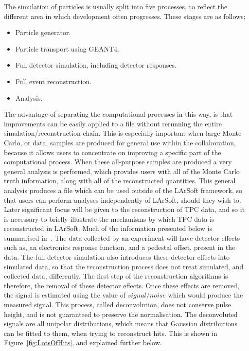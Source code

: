 The simulation of particles is usually split into five processes, to reflect the different area in which development often progresses. These stages are as follows;
\begin{itemize}
\item Particle generator.
\item Particle transport using GEANT4.
\item Full detector simulation, including detector responses. 
\item Full event reconstruction.
\item Analysis.
\end{itemize}
The advantage of separating the computational processes in this way, is that improvements can be easily applied to a file without rerunning the entire simulation/reconstruction chain. This is especially important when large Monte Carlo, or data, samples are produced for general use within the collaboration, because it allows users to concentrate on improving a specific part of the computational process. When these all-purpose samples are produced a very general analysis is performed, which provides users with all of the Monte Carlo truth information, along with all of the reconstructed quantities. This general analysis produces a file which can be used outside of the LArSoft framework, so that users can perform analyses independently of LArSoft, should they wish to. \\

Later significant focus will be given to the reconstruction of TPC data, and so it is necessary to briefly illustrate the mechanisms by which TPC data is reconstructed in LArSoft. Much of the information presented below is summarised in~\citep{LArSoftOrg, LArSoftRecoNote}. The data collected by an experiment will have detector effects such as, an electronics response function, and a pedestal offset, present in the data. The full detector simulation also introduces these detector effects into simulated data, so that the reconstruction process does not treat simulated, and collected data, differently. The first step of the reconstruction algorithms is therefore, the removal of these detector effects. Once these effects are removed, the signal is estimated using the value of $signal/noise$ which would produce the measured signal. This process, called deconvolution, does not conserve pulse height, and is not guaranteed to preserve the normalisation. The deconvoluted signals are all unipolar distributions, which means that Gaussian distributions can be fitted to them, when trying to reconstruct hits. This is shown in Figure~\ref{fig:LotsOfHits}, and explained further below.\\

